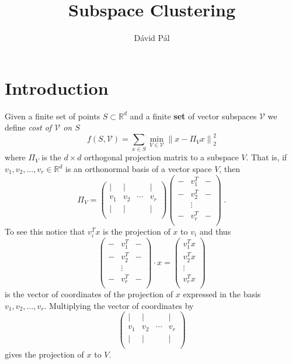 \documentclass{article}
\newcommand{\R}{\mathbb{R}}
\newcommand{\V}{\mathcal{V}}
\newcommand{\norm}[1]{\left\|#1\right\|}
\begin{document}
\title{Subspace Clustering}
\author{D\'avid P\'al}
\maketitle

\section{Introduction}

Given a finite set of points $S \subset \R^d$ and a finite \textbf{set} of
vector subspaces $\V$ we define \emph{cost of $\V$ on $S$}
$$
f(S, \V) = \sum_{x \in S} \min_{V \in \V} \norm{x - \Pi_V x}_2^2
$$
where $\Pi_V$ is the $d\times d$ orthogonal projection matrix to a subspace $V$.
That is, if $v_1, v_2, \dots, v_r \in \R^d$ is an orthonormal basis
of a vector space $V$, then
$$
\Pi_V =
\begin{pmatrix}
\vert & \vert &  & \vert \\
v_1 & v_2 & \cdots & v_r \\
\vert & \vert &  & \vert \\
\end{pmatrix}
\begin{pmatrix}
- & v_1^T & - \\
- & v_2^T & - \\
  & \vdots &  \\
- & v_r^T & - \\
\end{pmatrix} \; .
$$
To see this notice that $v_i^T x$ is the projection of $x$ to $v_i$
and thus
$$
\begin{pmatrix}
- & v_1^T & - \\
- & v_2^T & - \\
  & \vdots & \\
- & v_r^T & - \\
\end{pmatrix} \cdot x
=
\begin{pmatrix}
v_1^T x \\
v_2^T x \\
\vdots  \\
v_r^T x \\
\end{pmatrix}
$$
is the vector of coordinates of the projection of $x$ expressed in the basis $v_1, v_2, \dots, v_r$.
Multiplying the vector of coordinates by
$$
\begin{pmatrix}
\vert & \vert &  & \vert \\
v_1 & v_2 & \cdots & v_r \\
\vert & \vert &  & \vert \\
\end{pmatrix}
$$
gives the projection of $x$ to $V$.
\end{document}

